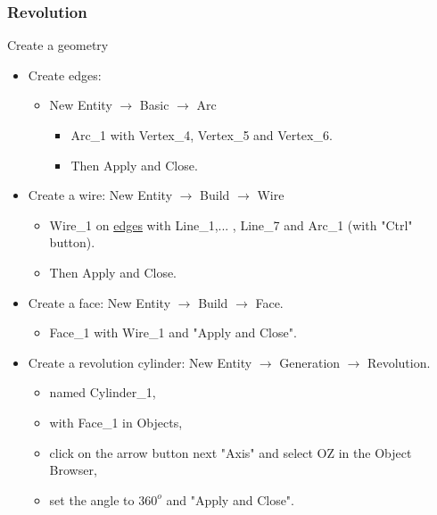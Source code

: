 \documentclass[10pt, hyperref={unicode=true,pdfusetitle, bookmarks=true,bookmarksnumbered=false,bookmarksopen=false, breaklinks=false,pdfborder={0 0l 1},backref=true,colorlinks=true,linkcolor=darkblue,pageanchor}]{beamer}
\begin{document}
\begin{frame}
\frametitle{Revolution}
\begin{block}{Create a geometry}

\begin{itemize}
\item Create edges:
    \begin{itemize}
    \item [$\circ$] New Entity $\rightarrow$ Basic $\rightarrow$ Arc
        \begin{itemize}
        \item [$\diamond$] Arc\_1 with Vertex\_4, Vertex\_5 and Vertex\_6.
        \item [$\diamond$] Then Apply and Close.
        \end{itemize}
    \end{itemize}

\item Create a wire: New Entity $\rightarrow$ Build $\rightarrow$ Wire
    \begin{itemize}
    \item [$\circ$] Wire\_1 on \underline{edges} with Line\_1,... , Line\_7 and Arc\_1 (with "Ctrl" button).
    \item [$\circ$] Then Apply and Close.
    \end{itemize}

\item Create a face: New Entity $\rightarrow$ Build $\rightarrow$ Face.
    \begin{itemize}
    \item [$\circ$] Face\_1 with Wire\_1 and "Apply and Close".
    \end{itemize}

\item Create a revolution cylinder: New Entity $\rightarrow$ Generation $\rightarrow$ Revolution.
    \begin{itemize}
    \item [$\circ$] named Cylinder\_1,
    \item [$\circ$] with Face\_1 in Objects,
    \item [$\circ$] click on the arrow button next "Axis" and select OZ in the Object Browser,
    \item [$\circ$] set the angle to $360^o$ and "Apply and Close".
    \end{itemize}
\end{itemize}

\end{block}
\end{frame}
\end{document}
